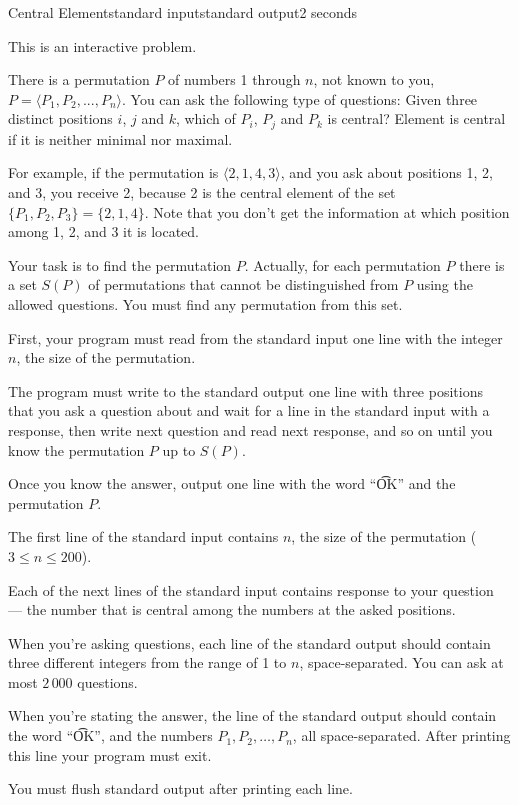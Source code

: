 \begin{problem}{Central Element}{standard input}{standard output}{2 seconds}


This is an interactive problem.

There is a permutation $P$ of numbers 1 through $n$, not known to you,
$P = \langle P_1, P_2, ..., P_n\rangle$.
You can ask the following type of questions:
Given three distinct positions $i$, $j$ and $k$, which of $P_i$, $P_j$ and $P_k$ 
is central? Element is central if it is neither minimal nor maximal.

For example, if the permutation is $\langle2, 1, 4, 3\rangle$, and you ask about positions 1, 2, and 3,
you receive 2, because 2 is the central element of the set $\{P_1, P_2, P_3\} = \{2, 1, 4\}$. 
Note that you don't get the information at which position among 1, 2, and 3 it is located.

Your task is to find the permutation $P$. Actually, for each permutation $P$
there is a set $S(P)$ of permutations that cannot be distinguished from $P$ using the allowed questions.
You must find any permutation from this set.

\Interaction

First, your program must read from the standard input one line with the integer $n$, the size of the permutation.

The program must write to the standard output one line with three positions that you ask a question about
and wait for a line in the standard input with a response, then write next question and read next 
response, and so on until you know the permutation $P$ up to $S(P)$.

Once you know the answer, output one line with the word ``\t{OK}'' and the permutation $P$.

\InputFile

The first line of the standard input contains $n$, the size of the permutation ($3 \le n \le 200$).

Each of the next lines of the standard input contains response to your question --- the number
that is central among the numbers at the asked positions.

\OutputFile

When you're asking questions, each line of the standard output should contain three different integers
from the range of 1 to $n$, space-separated. You can ask at most $2\,000$ questions.

When you're stating the answer, the line of the standard output should contain
the word ``\t{OK}'', and the numbers $P_1, P_2, \ldots, P_n$, all space-separated.
After printing this line your program must exit.

You must flush standard output after printing each line.

\Example

\begin{example}
%
\end{example}

\end{problem}
